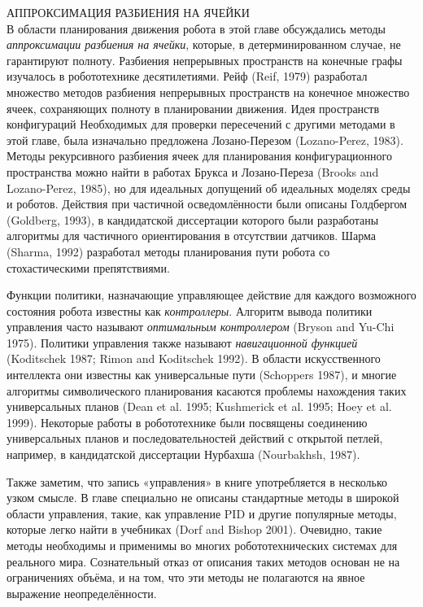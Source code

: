 \documentclass[10pt,a4paper]{article}
\begin{document}
АППРОКСИМАЦИЯ РАЗБИЕНИЯ НА ЯЧЕЙКИ\\

В области планирования движения робота в этой главе обсуждались методы \textit{аппроксимации разбиения на ячейки},  которые, в детерминированном случае, не гарантируют полноту. 
Разбиения непрерывных пространств на конечные графы изучалось в робототехнике десятилетиями. Рейф (Reif, 1979) разработал множество методов разбиения непрерывных пространств на конечное множество ячеек, сохраняющих полноту в планировании движения. Идея пространств конфигураций Необходимых для проверки пересечений с другими методами в этой главе, была изначально предложена Лозано-Перезом (Lozano-Perez, 1983). Методы рекурсивного разбиения ячеек для планирования конфигурационного пространства можно найти в работах Брукса и Лозано-Переза (Brooks and Lozano-Perez, 1985), но для идеальных допущений об идеальных моделях среды и роботов. Действия при частичной осведомлённости были описаны Голдбергом (Goldberg, 1993), в кандидатской диссертации которого были разработаны алгоритмы для частичного ориентирования в отсутствии датчиков. Шарма (Sharma, 1992) разработал методы планирования пути робота со стохастическими препятствиями.

Функции политики, назначающие управляющее действие для каждого возможного состояния робота известны как \textit{контроллеры}. Алгоритм вывода политики управления часто называют \textit{оптимальным контроллером} (Bryson and Yu-Chi 1975). Политики управления также называют \textit{навигационной функцией} (Koditschek 1987; Rimon and Koditschek 1992). В области искусственного интеллекта они известны как универсальные пути (Schoppers 1987), и многие алгоритмы символического планирования касаются проблемы нахождения таких универсальных планов (Dean et al. 1995; Kushmerick et al. 1995; Hoey et al. 1999). Некоторые работы в робототехнике были посвящены соединению универсальных планов и последовательностей действий с открытой петлей, например, в кандидатской диссертации Нурбахша (Nourbakhsh, 1987).

Также заметим, что запись «управления» в книге употребляется в несколько узком смысле. В главе специально не описаны стандартные методы в широкой области управления, такие, как управление PID и другие популярные методы, которые легко найти в учебниках (Dorf and Bishop 2001). Очевидно, такие методы необходимы и применимы во многих робототехнических системах для реального мира. Сознательный отказ от описания таких методов основан не на ограничениях объёма, и на том, что эти методы не полагаются на явное выражение неопределённости.\\
\end{document}
